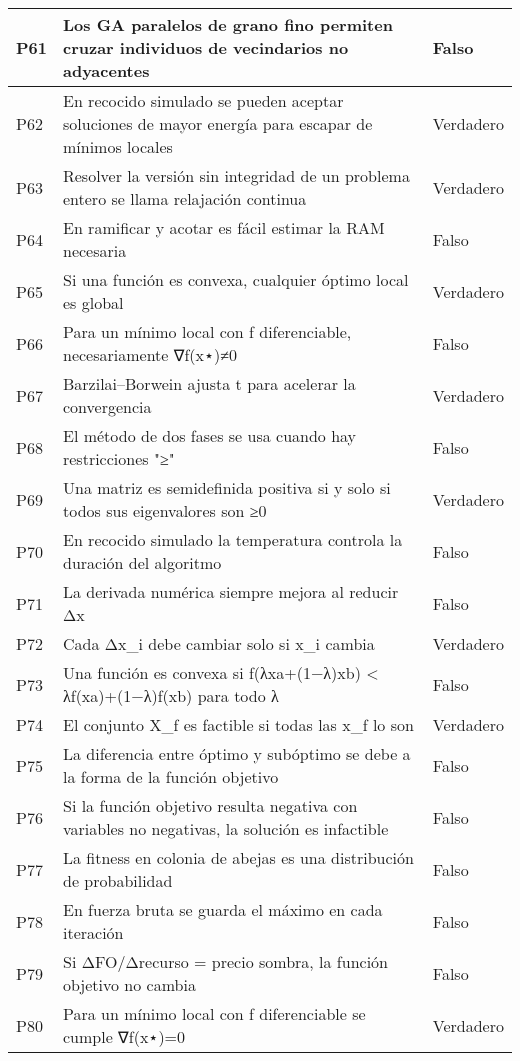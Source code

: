 \documentclass{article}
\begin{document}
\begin{longtable}{|>{\centering\arraybackslash}p{1.5cm}|>{\raggedright\arraybackslash}p{14cm}|>{\centering\arraybackslash}p{2cm}|}
\hline
P61 & Los GA paralelos de grano fino permiten cruzar individuos de vecindarios no adyacentes & Falso \\
\hline
P62 & En recocido simulado se pueden aceptar soluciones de mayor energía para escapar de mínimos locales & Verdadero \\
\hline
P63 & Resolver la versión sin integridad de un problema entero se llama relajación continua & Verdadero \\
\hline
P64 & En ramificar y acotar es fácil estimar la RAM necesaria & Falso \\
\hline
P65 & Si una función es convexa, cualquier óptimo local es global & Verdadero \\
\hline
P66 & Para un mínimo local con f diferenciable, necesariamente ∇f(x⋆)≠0 & Falso \\
\hline
P67 & Barzilai–Borwein ajusta t para acelerar la convergencia & Verdadero \\
\hline
P68 & El método de dos fases se usa cuando hay restricciones "≥" & Falso \\
\hline
P69 & Una matriz es semidefinida positiva si y solo si todos sus eigenvalores son ≥0 & Verdadero \\
\hline
P70 & En recocido simulado la temperatura controla la duración del algoritmo & Falso \\
\hline
P71 & La derivada numérica siempre mejora al reducir Δx & Falso \\
\hline
P72 & Cada Δx\_i debe cambiar solo si x\_i cambia & Verdadero \\
\hline
P73 & Una función es convexa si f(λxa+(1−λ)xb) < λf(xa)+(1−λ)f(xb) para todo λ & Falso \\
\hline
P74 & El conjunto X\_f es factible si todas las x\_f lo son & Verdadero \\
\hline
P75 & La diferencia entre óptimo y subóptimo se debe a la forma de la función objetivo & Falso \\
\hline
P76 & Si la función objetivo resulta negativa con variables no negativas, la solución es infactible & Falso \\
\hline
P77 & La fitness en colonia de abejas es una distribución de probabilidad & Falso \\
\hline
P78 & En fuerza bruta se guarda el máximo en cada iteración & Falso \\
\hline
P79 & Si ΔFO/Δrecurso = precio sombra, la función objetivo no cambia & Falso \\
\hline
P80 & Para un mínimo local con f diferenciable se cumple ∇f(x⋆)=0 & Verdadero \\

\end{longtable}
\end{document}
